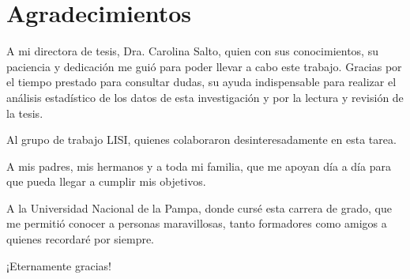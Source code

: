 \chapter*{Agradecimientos} 

A mi directora de tesis, Dra. Carolina Salto, quien con sus conocimientos, su paciencia y dedicación me guió para poder llevar a cabo este trabajo. Gracias por el tiempo prestado para consultar dudas, su ayuda indispensable para realizar el análisis estadístico de los datos de esta investigación y por la
lectura y revisión de la tesis.

Al grupo de trabajo LISI, quienes colaboraron desinteresadamente en esta tarea.

A mis padres, mis hermanos y a toda mi familia, que me apoyan día a día para que pueda llegar a cumplir mis objetivos.

A la Universidad Nacional de la Pampa, donde cursé esta carrera de grado, que me permitió conocer a personas maravillosas, tanto formadores como amigos a quienes recordaré por siempre.

\begin{flushright}
¡Eternamente gracias!
\end{flushright}